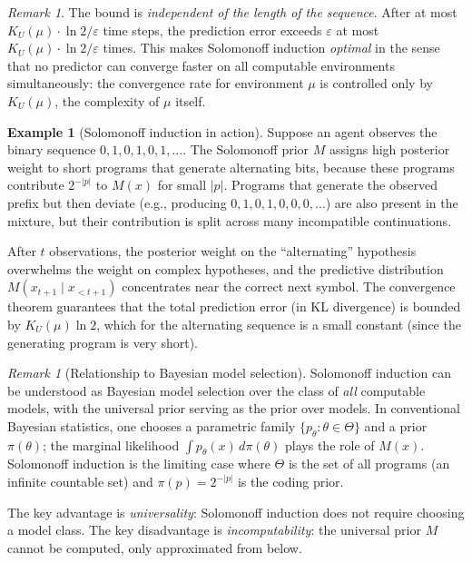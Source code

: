 \documentclass[11pt,a4paper]{article}
\theoremstyle{definition}
\newtheorem{example}[theorem]{Example}
\theoremstyle{remark}
\newtheorem{remark}[theorem]{Remark}
\begin{document}
\begin{remark}
The bound is \emph{independent of the length of the sequence}.
After at most $K_U(\mu)\cdot\ln 2/\varepsilon$ time steps, the prediction
error exceeds $\varepsilon$ at most $K_U(\mu)\cdot\ln 2/\varepsilon$ times.
This makes Solomonoff induction \emph{optimal} in the sense that no predictor
can converge faster on all computable environments simultaneously: the
convergence rate for environment $\mu$ is controlled only by $K_U(\mu)$,
the complexity of $\mu$ itself.
\end{remark}

\begin{example}[Solomonoff induction in action]\label{ex:solomonoff}
Suppose an agent observes the binary sequence $0,1,0,1,0,1,\ldots$.
The Solomonoff prior $M$ assigns high posterior weight to short programs that
generate alternating bits, because these programs contribute $2^{-|p|}$ to
$M(x)$ for small $|p|$.  Programs that generate the observed prefix but then
deviate (e.g., producing $0,1,0,1,0,0,0,\ldots$) are also present in the
mixture, but their contribution is split across many incompatible continuations.

After $t$ observations, the posterior weight on the ``alternating'' hypothesis
overwhelms the weight on complex hypotheses, and the predictive distribution
$M(x_{t+1}\mid x_{<t+1})$ concentrates near the correct next symbol.
The convergence theorem guarantees that the total prediction error
(in KL divergence) is bounded by $K_U(\mu)\ln 2$, which for the alternating
sequence is a small constant (since the generating program is very short).
\end{example}

\begin{remark}[Relationship to Bayesian model selection]
Solomonoff induction can be understood as Bayesian model selection over the
class of \emph{all} computable models, with the universal prior serving as the
prior over models.  In conventional Bayesian statistics, one chooses a
parametric family $\{p_\theta:\theta\in\Theta\}$ and a prior $\pi(\theta)$;
the marginal likelihood $\int p_\theta(x)\,d\pi(\theta)$ plays the role
of $M(x)$.  Solomonoff induction is the limiting case where $\Theta$ is
the set of all programs (an infinite countable set) and
$\pi(p)=2^{-|p|}$ is the coding prior.

The key advantage is \emph{universality}: Solomonoff induction does not
require choosing a model class.  The key disadvantage is
\emph{incomputability}: the universal prior $M$ cannot be computed, only
approximated from below.
\end{remark}
\end{document}

